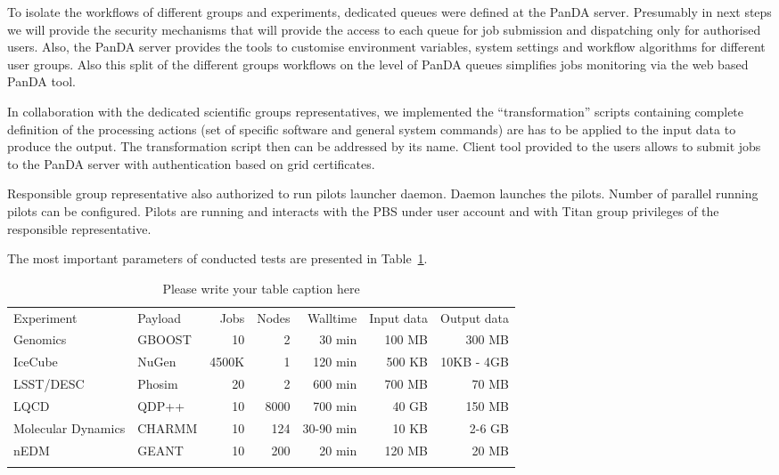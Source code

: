 To isolate the workflows of different groups and experiments, dedicated queues
were defined at the PanDA server. Presumably in  next steps we will provide the
security mechanisms that will provide the access to each queue for job
submission and dispatching only for authorised users. Also, the PanDA server
provides the tools to customise environment variables, system settings and
workflow algorithms for different user groups. Also this split of the different
groups workflows on the level of PanDA queues simplifies jobs monitoring via
the web based PanDA tool. 

In collaboration with the dedicated scientific groups representatives, we
implemented the ``transformation'' scripts containing complete definition of
the processing actions (set of specific software and general system commands)
are has to be applied to the input data to produce the output. The
transformation script then can be addressed by its name. Client tool provided
to the users allows to submit jobs to the PanDA server with authentication
based on grid certificates. 

Responsible group representative also authorized to run pilots launcher daemon.
Daemon launches the pilots. Number of parallel running pilots can be
configured. Pilots are running and interacts with the PBS under user account
and with Titan group privileges of the responsible representative.

The most important parameters of conducted tests are presented in
Table~\ref{tab:beyondhep}.

\begin{table}
\caption{Please write your table caption here}
\label{tab:beyondhep}       %
\begin{tabular}{llrrrrr}
\hline\noalign{\smallskip}
Experiment & Payload & Jobs & Nodes & Walltime & Input data & Output data \\
\noalign{\smallskip}\hline\noalign{\smallskip}
Genomics           & GBOOST & 10    & 2    & 30 min    & 100 MB & 300 MB \\
IceCube            & NuGen  & 4500K & 1    & 120 min   & 500 KB & 10KB - 4GB \\
LSST/DESC          & Phosim & 20    & 2    & 600 min   & 700 MB & 70 MB \\
LQCD               & QDP++  & 10    & 8000 & 700 min   & 40 GB  & 150 MB \\
Molecular Dynamics & CHARMM & 10    & 124  & 30-90 min & 10 KB  & 2-6 GB \\
nEDM               & GEANT  & 10    & 200  & 20 min    & 120 MB & 20 MB \\
\noalign{\smallskip}\hline
\end{tabular}
\end{table}


